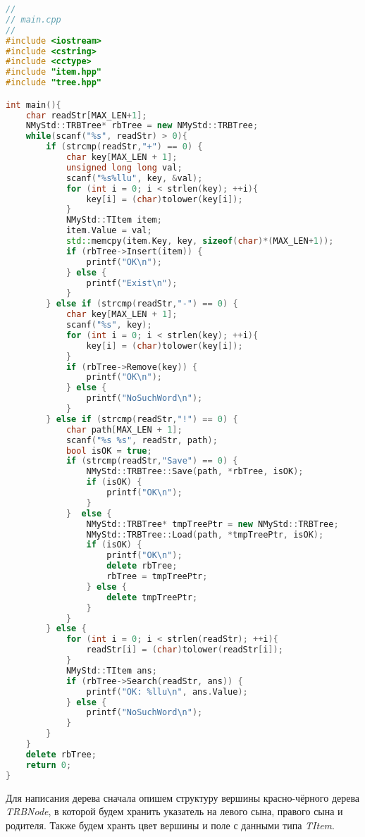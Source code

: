 \begin{lstlisting}[language=C++]
//
// main.cpp
//
#include <iostream>
#include <cstring>
#include <cctype>
#include "item.hpp"
#include "tree.hpp"

int main(){
    char readStr[MAX_LEN+1];
    NMyStd::TRBTree* rbTree = new NMyStd::TRBTree;
    while(scanf("%s", readStr) > 0){
        if (strcmp(readStr,"+") == 0) {
            char key[MAX_LEN + 1];
            unsigned long long val;
            scanf("%s%llu", key, &val);
            for (int i = 0; i < strlen(key); ++i){
                key[i] = (char)tolower(key[i]);
            }
            NMyStd::TItem item;
            item.Value = val;
            std::memcpy(item.Key, key, sizeof(char)*(MAX_LEN+1));
            if (rbTree->Insert(item)) {
                printf("OK\n");
            } else {
                printf("Exist\n");
            }
        } else if (strcmp(readStr,"-") == 0) {
            char key[MAX_LEN + 1];
            scanf("%s", key);
            for (int i = 0; i < strlen(key); ++i){
                key[i] = (char)tolower(key[i]);
            }
            if (rbTree->Remove(key)) {
                printf("OK\n");
            } else {
                printf("NoSuchWord\n");
            }
        } else if (strcmp(readStr,"!") == 0) {
            char path[MAX_LEN + 1];
            scanf("%s %s", readStr, path);
            bool isOK = true;
            if (strcmp(readStr,"Save") == 0) {
                NMyStd::TRBTree::Save(path, *rbTree, isOK);
                if (isOK) {
                    printf("OK\n");
                }
            }  else {
                NMyStd::TRBTree* tmpTreePtr = new NMyStd::TRBTree;
                NMyStd::TRBTree::Load(path, *tmpTreePtr, isOK);
                if (isOK) {
                    printf("OK\n");
                    delete rbTree;
                    rbTree = tmpTreePtr;
                } else {
                    delete tmpTreePtr;
                }
            }
        } else {
            for (int i = 0; i < strlen(readStr); ++i){
                readStr[i] = (char)tolower(readStr[i]);
            }
            NMyStd::TItem ans;
            if (rbTree->Search(readStr, ans)) {
                printf("OK: %llu\n", ans.Value);
            } else {
                printf("NoSuchWord\n");
            }
        }
    }
    delete rbTree;
    return 0;
}
\end{lstlisting}
Для написания дерева сначала опишем структуру вершины красно-чёрного дерева \textit{TRBNode}, в которой будем хранить
указатель на левого сына, правого сына и родителя. Также будем хранть цвет вершины и поле с данными типа \textit{TItem}.
